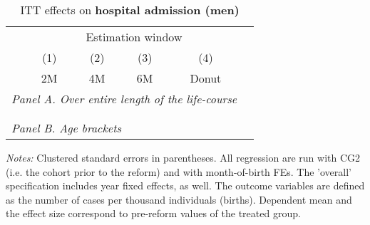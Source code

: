  \vspace*{\fill}
 \begin{table}[H] \centering 
 	\begin{threeparttable} \centering \caption{ITT effects on \textbf{hospital admission (men)}}\label{tab: DD_hopsital2_male} {\def\sym#1{\ifmmode^{#1}\else\(^{#1}\)\fi} 
 			\begin{tabular}{l*{5}{c}}
 				\toprule 
 				& \multicolumn{4}{c}{Estimation window} \\ 
 				\cmidrule(lr){2-5}
 				&\multicolumn{1}{c}{(1)}&\multicolumn{1}{c}{(2)}&\multicolumn{1}{c}{(3)}&\multicolumn{1}{c}{(4)}\\
 				&\multicolumn{1}{c}{2M}&\multicolumn{1}{c}{4M}&\multicolumn{1}{c}{6M}&\multicolumn{1}{c}{Donut}\\
 				\midrule
 				\multicolumn{5}{l}{\emph{Panel A. Over entire length of the life-course}} \\
 				 \\ \\
 				\multicolumn{5}{l}{\emph{Panel B. Age brackets}} \\
 				    
 				\bottomrule 
 		\end{tabular}}
 		\begin{tablenotes} 
 			\item \scriptsize \emph{Notes:} Clustered standard errors in parentheses. All regression are run with CG2 (i.e. the cohort prior to the reform) and with month-of-birth FEs. The 'overall' specification includes year fixed effects, as well. The outcome variables are defined as the number of cases per thousand individuals (births). Dependent mean and the effect size correspond to pre-reform values of the treated group.
 		\end{tablenotes} 
 	\end{threeparttable} 
 \end{table} 
\vspace*{\fill}\clearpage 